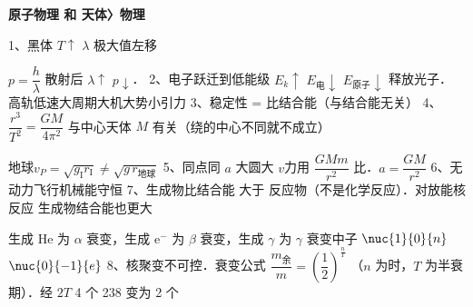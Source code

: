 \textbf{原子物理 和 天体〉物理}%

1、黑体 $T\uparrow$ $\lambda$ 极大值左移%


$p=\dfrac h\lambda$ 散射后 $\lambda\uparrow$ $p\downarrow$．
2、电子跃迁到低能级 $E_k\uparrow$ $E_{\text{电}}\downarrow$ $E_{\text{原子}}\downarrow$ 释放光子．%
高轨低速大周期大机大势小引力%
3、稳定性 = 比结合能（与结合能无关）
4、$\dfrac{r^3}{T^2}=\dfrac{GM}{4\pi^2}$ 与中心天体 $M$ 有关（绕的中心不同就不成立）


地球\quad $v_P=\sqrt{g_{\mathrm{I}}r_{\mathrm{I}}}\neq\sqrt{g\,r_{\text{地球}}}$%
5、同点同 $a$ 大圆大 $v$\quad 力用 $\dfrac{GMm}{r^2}$ 比．$a=\dfrac{GM}{r^2}$
6、无动力飞行机械能守恒%
7、生成物比结合能 大于 反应物（不是化学反应）．对放能核反应 生成物结合能也更大

生成 He 为 $\alpha$ 衰变，生成 $\mathrm{e}^-$ 为 $\beta$ 衰变，生成 $\gamma$ 为 $\gamma$ 衰变\quad 中子 $\nuc{1}{0}{n}$\quad $\nuc{0}{-1}{e}$
8、核聚变不可控．\quad 衰变公式 $\dfrac{m_{\text{余}}}{m}=\left(\dfrac12\right)^{\frac nT}$%
\quad（$n$ 为时，$T$ 为半衰期）．经 $2T$ 4 个 238 变为 2 个%

